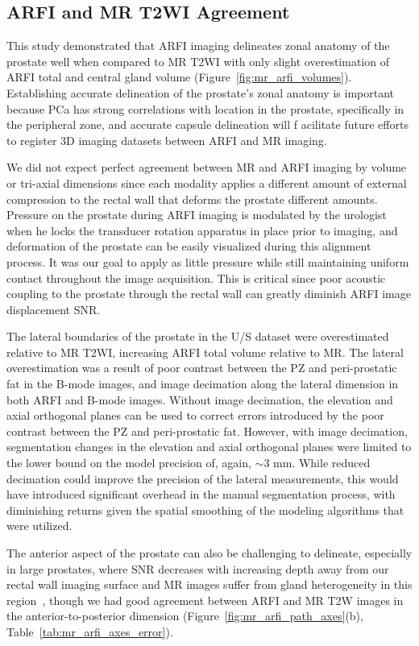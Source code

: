 \subsection{ARFI and MR T2WI Agreement}
This study demonstrated that ARFI imaging delineates zonal anatomy of the
prostate well when compared to MR T2WI with only slight overestimation of 
ARFI total and central gland volume (Figure~\ref{fig:mr_arfi_volumes}). 
 Establishing accurate delineation of the prostate's zonal anatomy is 
important because PCa has strong correlations with location in the prostate, 
specifically in the peripheral zone, and accurate capsule delineation will f
acilitate future efforts to register 3D imaging datasets between ARFI and MR imaging. 

We did not expect perfect agreement between MR and ARFI imaging by volume or tri-axial
 dimensions since each modality applies a different amount of external compression to 
the rectal wall that deforms the prostate different amounts. Pressure on the prostate 
during ARFI imaging is modulated by the urologist when he locks the transducer rotation 
apparatus in place prior to imaging, and deformation of the prostate can be easily visualized
 during this alignment process.  It was our goal to apply as little pressure while still maintaining
 uniform contact throughout the image acquisition. This is critical since poor acoustic coupling to 
the prostate through the rectal wall can greatly diminish ARFI image displacement SNR.

The lateral boundaries of the prostate in the U/S dataset were overestimated relative to MR T2WI, increasing 
ARFI total volume relative to MR. The lateral overestimation was a result of poor contrast between the PZ and 
peri-prostatic fat in the B-mode images, and image decimation along the lateral dimension in both ARFI and B-mode 
images. Without image decimation, the elevation and axial orthogonal planes can be used to correct errors introduced
 by the poor contrast between the PZ and peri-prostatic fat. However, with image decimation, segmentation changes in 
the elevation and axial orthogonal planes were limited to the lower bound on the model precision of, again, $\sim$3 mm.
 While reduced decimation could improve the precision of the lateral measurements, this would have introduced significant 
overhead in the manual segmentation process, with diminishing returns given the spatial smoothing of the modeling algorithms
 that were utilized. 

The anterior aspect of the prostate can also be challenging to delineate,
especially in large prostates, where SNR decreases with increasing depth away
from our rectal wall imaging surface and MR images suffer from gland
heterogeneity in this region~\cite{Gupta2013}, though we had good agreement
between ARFI and MR T2W images in the anterior-to-posterior dimension
(Figure~\ref{fig:mr_arfi_path_axes}(b), Table~\ref{tab:mr_arfi_axes_error}).


